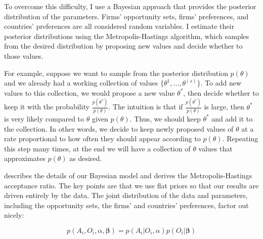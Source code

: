 To overcome this difficulty, I use a Bayesian approach that provides the posterior distribution of the parameters. Firms' opportunity sets, firms' preferences, and countries' preferences are all considered random variables. I estimate their posterior distributions using the Metropolis-Hastings algorithm, which samples from the desired distribution by proposing new values and decide whether to those values. 

For example, suppose we want to sample from the posterior distribution $p(\theta)$ and we already had a working collection of values $\{\theta^{1}, \dots, \theta^{(s)}\}$. To add new values to this collection, we would propose a new value $\theta^*$, then decide whether to keep it with the probability $\frac{p(\theta^*)}{p(\theta)}$. The intuition is that if $\frac{p(\theta^*)}{p(\theta)}$ is large, then $\theta^*$ is very likely compared to $\theta$ given $p(\theta)$. Thus, we should keep $\theta^*$ and add it to the collection. In other words, we decide to keep newly proposed values of $\theta$ at a rate proportional to how often they should appear according to $p(\theta)$. Repeating this step many times, at the end we will have a collection of $\theta$ values that approximates $p(\theta)$ as desired.

 describes the details of our Bayesian model and derives the Metropolis-Hastings acceptance ratio. The key points are that we use flat priors so that our results are driven entirely by the data. The joint distribution of the data and parameters, including the opportunity sets, the firms' and countries' preferences, factor out nicely:

\[
p(A_i, O_i, \alpha, \bm{\beta}) = p(A_i|O_i, \alpha) p(O_i | \bm{\beta})
\]
